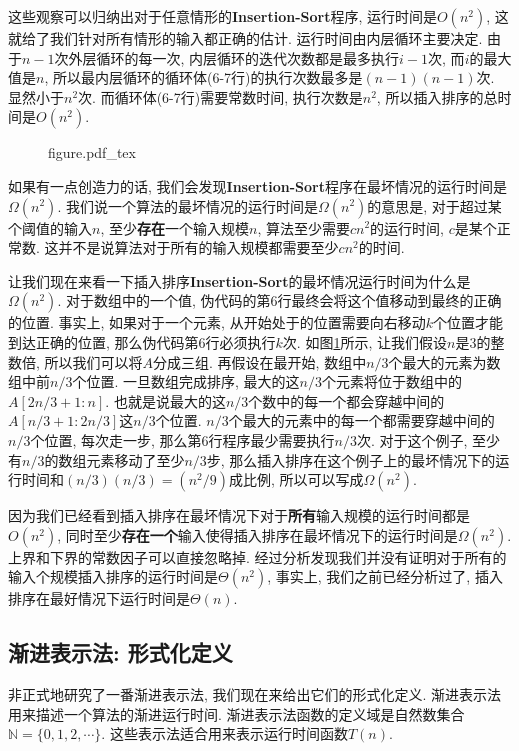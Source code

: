 \documentclass[oneside,10pt,fontset=none]{ctexbook}
\numberwithin{definition}{chapter}
\numberwithin{theorem}{chapter}
\numberwithin{lemma}{chapter}
\begin{document}
这些观察可以归纳出对于任意情形的\textbf{Insertion-Sort}程序, 运行时间是$O(n^2)$, 这就给了我们针对所有情形的输入都正确的估计. 运行时间由内层循环主要决定. 由于$n-1$次外层循环的每一次, 内层循环的迭代次数都是最多执行$i-1$次, 而$i$的最大值是$n$, 所以最内层循环的循环体(6-7行)的执行次数最多是$(n-1)(n-1)$次. 显然小于$n^2$次. 而循环体(6-7行)需要常数时间, 执行次数是$n^2$, 所以插入排序的总时间是$O(n^2)$.

\begin{figure}[htbp]
    \def\svgwidth{\columnwidth}
    {figure.pdf_tex}
    \label{fig:插入排序的下界分析}
\end{figure}

如果有一点创造力的话, 我们会发现\textbf{Insertion-Sort}程序在最坏情况的运行时间是$\Omega(n^2)$. 我们说一个算法的最坏情况的运行时间是$\Omega(n^2)$的意思是, 对于超过某个阈值的输入$n$, 至少\textbf{存在}一个输入规模$n$, 算法至少需要$cn^2$的运行时间, $c$是某个正常数. 这并不是说算法对于所有的输入规模都需要至少$cn^2$的时间.

让我们现在来看一下插入排序\textbf{Insertion-Sort}的最坏情况运行时间为什么是$\Omega(n^2)$. 对于数组中的一个值, 伪代码的第6行最终会将这个值移动到最终的正确的位置. 事实上, 如果对于一个元素, 从开始处于的位置需要向右移动$k$个位置才能到达正确的位置, 那么伪代码第6行必须执行$k$次. 如图\ref{fig:插入排序的下界分析}所示, 让我们假设$n$是3的整数倍, 所以我们可以将$A$分成三组. 再假设在最开始, 数组中$n/3$个最大的元素为数组中前$n/3$个位置. 一旦数组完成排序, 最大的这$n/3$个元素将位于数组中的$A[2n/3+1:n]$. 也就是说最大的这$n/3$个数中的每一个都会穿越中间的$A[n/3+1:2n/3]$这$n/3$个位置. $n/3$个最大的元素中的每一个都需要穿越中间的$n/3$个位置, 每次走一步, 那么第6行程序最少需要执行$n/3$次. 对于这个例子, 至少有$n/3$的数组元素移动了至少$n/3$步, 那么插入排序在这个例子上的最坏情况下的运行时间和$(n/3)(n/3)=(n^2/9)$成比例, 所以可以写成$\Omega(n^2)$.

因为我们已经看到插入排序在最坏情况下对于\textbf{所有}输入规模的运行时间都是$O(n^2)$, 同时至少\textbf{存在一个}输入使得插入排序在最坏情况下的运行时间是$\Omega(n^2)$. 上界和下界的常数因子可以直接忽略掉. 经过分析发现我们并没有证明对于所有的输入个规模插入排序的运行时间是$\Theta(n^2)$, 事实上, 我们之前已经分析过了, 插入排序在最好情况下运行时间是$\Theta(n)$.

\subsection{渐进表示法: 形式化定义}

非正式地研究了一番渐进表示法, 我们现在来给出它们的形式化定义. 渐进表示法用来描述一个算法的渐进运行时间. 渐进表示法函数的定义域是自然数集合$\mathbb{N}=\{0,1,2,\cdots\}$. 这些表示法适合用来表示运行时间函数$T(n)$.
\end{document}
